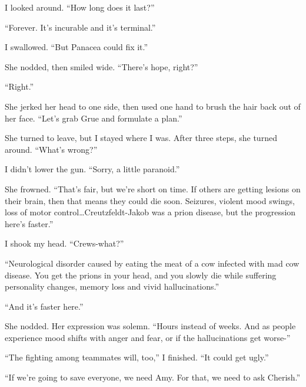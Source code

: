 I looked around.  ``How long does it last?''



``Forever.  It's incurable and it's terminal.''



I swallowed.  ``But Panacea could fix it.''



She nodded, then smiled wide.  ``There's hope, right?''



``Right.''



She jerked her head to one side, then used one hand to brush the hair back out of her face.  ``Let's grab Grue and formulate a plan.''



She turned to leave, but I stayed where I was.  After three steps, she turned around.  ``What's wrong?''



I didn't lower the gun.  ``Sorry, a little paranoid.''



She frowned.  ``That's fair, but we're short on time.  If others are getting lesions on their brain, then that means they could die soon.  Seizures, violent mood swings, loss of motor control\ldots  Creutzfeldt-Jakob was a prion disease, but the progression here's faster.''



I shook my head.  ``Crews-what?''



``Neurological disorder caused by eating the meat of a cow infected with mad cow disease.  You get the prions in your head, and you slowly die while suffering personality changes, memory loss and vivid hallucinations.''



``And it's faster here.''



She nodded.  Her expression was solemn.  ``Hours instead of weeks.  And as people experience mood shifts with anger and fear, or if the hallucinations get worse-''



``The fighting among teammates will, too,'' I finished.  ``It could get ugly.''



``If we're going to save everyone, we need Amy.  For that, we need to ask Cherish.''




